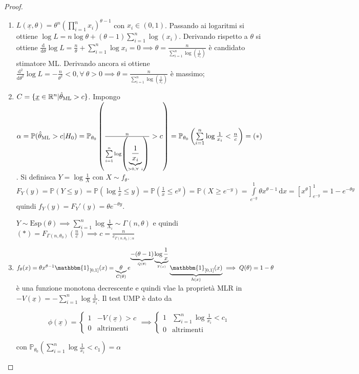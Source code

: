 \documentclass[hidelinks, 10pt]{report}
\begin{document}
\begin{proof}
\noindent
\begin{enumerate}
\item $ L(\underline{x}, \theta) = \theta^{n} \left( \prod\limits_{i = 1}^{n} x_{i} \right)^{\theta - 1} $ con $ x_{i} \in (0,1) $. Passando ai logaritmi si ottiene $ \log L = n \log \theta + (\theta - 1) \sum\limits_{i = 1}^{n} \log (x_{i}) $. Derivando rispetto a $ \theta $ si ottiene $ \frac{\mathrm{d}}{\mathrm{d} \theta} \log L = \frac{n}{\theta} + \sum\limits_{i = 1}^{n} \log x_{i} = 0 \implies \theta = \frac{n}{\sum\limits_{i = 1}^{n} \log \left( \frac{1}{x_{i}} \right)} $ \`e candidato stimatore ML. Derivando ancora si ottiene $ \frac{\mathrm{d}^{2}}{\mathrm{d} \theta^{2}} \log L = - \frac{n}{\theta^{2}} < 0, \forall\ \theta > 0 \implies \theta = \frac{n}{\sum\limits_{i = 1}^{n} \log \left( \frac{1}{x_{i}} \right)} $ \`e massimo;
\item $ C = \{ \underline{x} \in \mathbb{R}^{n} \vert \hat{\theta}_{\text{ML}} > c \} $. Impongo $ \alpha = \mathbb{P}(\hat{\theta}_{\text{ML}} > c \vert H_{0}) = \mathbb{P} _{\theta_{0}} \left( \frac{n}{\sum\limits_{i = 1}^{n} \log \left( \underbrace{\frac{1}{x_{i}}}_{> 0, \forall\ i} \right)} > c \right) = \mathbb{P}_{\theta_{0}} \left( \sum\limits_{i = 1}^{n} \log \frac{1}{x_{i}} < \frac{n}{c} \right) = (\ast) $. Si definisca $ Y = \log \frac{1}{X} $ con $ X \sim f_{\theta} $. $ F_{Y}(y) = \mathbb{P} (Y \le y) = \mathbb{P} \left( \log \frac{1}{x} \le y \right) = \mathbb{P} \left( \frac{1}{x} \le e^{y} \right) = \mathbb{P} (X \ge e^{-y}) = \int\limits_{e^{-y}}^{1} \theta x^{\theta - 1} \, \mathrm{d}x = [x^{\theta}]^{1}_{e^{-y}} = 1 - e^{-\theta y} $ quindi $ f_{Y}(y) = F_{Y}' (y) = \theta e^{- \theta y} $. 

$ Y \sim \text{Esp} (\theta) \implies \sum\limits_{i = 1}^{n} \log \frac{1}{X_{i}} \sim \Gamma (n, \theta) $ e quindi $ (\ast) = F_{\Gamma(n, \theta_{0})} \left( \frac{n}{c} \right) \implies c = \frac{n}{c_{\Gamma(n, \theta_{0}); \alpha}} $
\item $ f_{\theta}(x) = \theta x^{\theta - 1} \mathbbm{1}_{[0,1]} (x) = \underbrace{\theta}_{C(\theta)} e^{\underbrace{-(\theta - 1)}_{Q(\theta)} \underbrace{\log \frac{1}{x}}_{T(x)}} \underbrace{\mathbbm{1}_{[0,1]} (x)}_{h(x)} \implies Q(\theta) = 1 - \theta $ \`e una funzione monotona decrescente e quindi vlae la propriet\`a MLR in $ - V(\underline{x}) = - \sum\limits_{i = 1}^{n} \log \frac{1}{x_{i}} $. Il test UMP \`e dato da

\[ \phi(\underline{x}) = \begin{cases}
1 & -V(\underline{x}) > c \\
0 & \text{altrimenti}
\end{cases} \implies \begin{cases}
1 & \sum\limits_{i = 1}^{n} \log \frac{1}{x_{i}} < c_{1} \\	%
0 & \text{altrimenti}
\end{cases} \]

con $ \mathbb{P}_{\theta_{0}} \left( \sum\limits_{i = 1}^{n} \log \frac{1}{x_{i}} < c_{1} \right) = \alpha $
\end{enumerate}
\end{proof}
\end{document}
